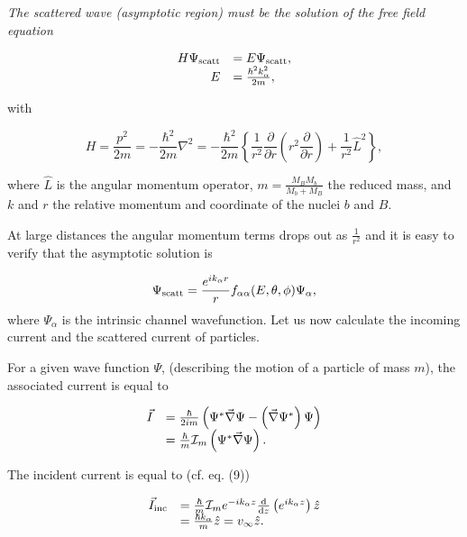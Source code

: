 {\it The scattered wave (asymptotic region) must be the solution of the free field equation}

\begin{equation}
\begin{array}{rl}
H \Psi_{\rm scatt} &= E \Psi_{\rm scatt}, \\
E &= \frac{\hbar^2 k_{\alpha}^2}{2m},
\end{array}
\end{equation}

\noindent with

\begin{equation}
H = \frac{p^2}{2m} = - \frac{\hbar^2}{2m} \nabla^2 = - \frac{\hbar^2}{2m} \left\{ \frac{1}{r^2} \frac{\partial}{\partial r} \left( r^2 \frac{\partial}{\partial r} \right) + \frac{1}{r^2} \hat{L}^2 \right\},
\end{equation}

\noindent where $\hat{L}$ is the angular momentum operator, $m = \frac{M_B M_b}{M_b + M_B}$ the reduced mass, and $k$ and $r$ the relative momentum and coordinate of the nuclei $b$ and $B$.

\noindent At large distances the angular momentum terms drops out as $\frac{1}{r^2}$ and it is easy to verify that the asymptotic solution is

\begin{equation}
\Psi_{\rm scatt} = \frac{e^{ik_{\alpha} r}}{r} f_{\alpha \alpha}(E, \theta, \phi) \Psi_{\alpha},
\end{equation}
where $\Psi_{\alpha}$ is the intrinsic channel wavefunction.
\noindent Let us now calculate the incoming current and the scattered current of particles.

For a given wave function $\Psi$, (describing the motion of a particle of mass $m$), the associated current is equal to

\begin{equation}
\begin{array}{rl}
\vec{I} &= \frac{\hbar}{2im} \left( \Psi^* \vec{\nabla} \Psi - \left( \vec{\nabla} \Psi^* \right) \Psi \right) \\
&= \frac{\hbar}{m} {\cal I}_m \left( \Psi^* \vec{\nabla} \Psi \right).
\end{array}
\end{equation}

The incident current is equal to (cf. eq. (9))

\begin{equation}
\begin{array}{rl}
\vec{I}_{\rm inc} &= \frac{\hbar}{m} {\cal I}_m e^{-i k_{\alpha} z} \frac{\rm d}{{\rm d}z} \left( e^{i k_{\alpha} z} \right) \hat{z} \\
&= \frac{\hbar k_{\alpha}}{m} \hat{z} = v_{\infty} \hat{z}.
\end{array}
\end{equation}

